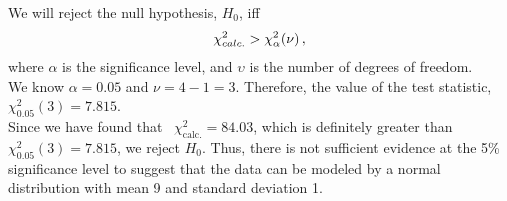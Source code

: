 \begin{subquestions}
\begin{subsubquestions}
We will reject the null hypothesis, $H_0$, iff 
\begin{align}
	\chi^2_{calc.} > \chi^2_{\alpha} (\nu) \,, \nonumber 
\end{align}
where $\alpha$ is the significance level, and $\upsilon$ is the number of degrees of freedom. \\

We know $\alpha= 0.05$ and $\nu = 4-1=3$. Therefore, the value of the test statistic, $\chi^2_{0.05}(3)=7.815$. \\

Since we have found that ~$\chi^2_{\text{calc.}} = 84.03$, which is definitely greater than ~$\chi^2_{0.05}(3)=7.815$, we reject $H_0$. Thus, there is not sufficient evidence at the 5\% significance level to suggest that the data can be modeled by a normal distribution with mean 9 and standard deviation 1.

\end{subsubquestions}

\end{subquestions}

